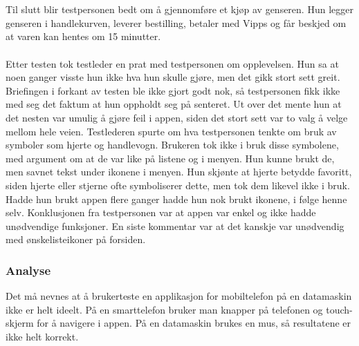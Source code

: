 \\\\
Til slutt blir testpersonen bedt om å gjennomføre et kjøp av genseren. Hun legger genseren i handlekurven, leverer bestilling, betaler med Vipps og får beskjed om at varen kan hentes om 15 minutter.
\\\\
Etter testen tok testleder en prat med testpersonen om opplevelsen. Hun sa at noen ganger visste hun ikke hva hun skulle gjøre, men det gikk stort sett greit. Briefingen i forkant av testen ble ikke gjort godt nok, så testpersonen fikk ikke med seg det faktum at hun oppholdt seg på senteret. Ut over det mente hun at det nesten var umulig å gjøre feil i appen, siden det stort sett var to valg å velge mellom hele veien. Testlederen spurte om hva testpersonen tenkte om bruk av symboler som hjerte og handlevogn. Brukeren tok ikke i bruk disse symbolene, med argument om at de var like på listene og i menyen. Hun kunne brukt de, men savnet tekst under ikonene i menyen. Hun skjønte at hjerte betydde favoritt, siden hjerte eller stjerne ofte symboliserer dette, men tok dem likevel ikke i bruk. Hadde hun brukt appen flere ganger hadde hun nok brukt ikonene, i følge henne selv. Konklusjonen fra testpersonen var at appen var enkel og ikke hadde unødvendige funksjoner. En siste kommentar var at det kanskje var unødvendig med ønskelisteikoner på forsiden.

\subsubsection{Analyse}
Det må nevnes at å brukerteste en applikasjon for mobiltelefon på en datamaskin ikke er helt ideelt. På en smarttelefon bruker man knapper på telefonen og touch-skjerm for å navigere i appen. På en datamaskin brukes en mus, så resultatene er ikke helt korrekt. 

